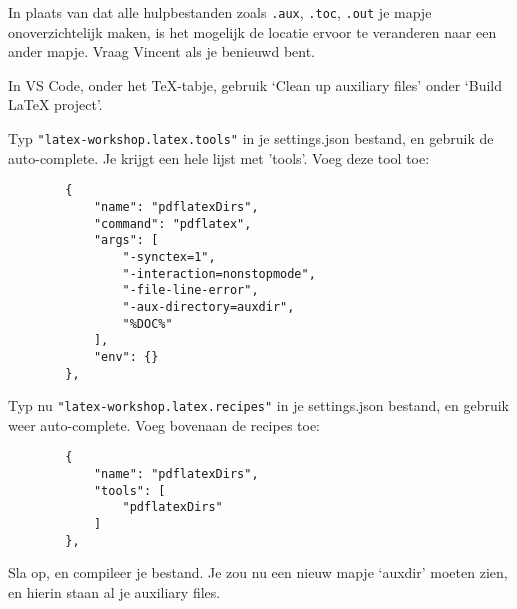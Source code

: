 \documentclass[a4paper]{article}
\begin{document}
\begin{exercise}\label{ex:auxDir}
    In plaats van dat alle hulpbestanden zoals \texttt{.aux}, \texttt{.toc}, \texttt{.out}
    je mapje onoverzichtelijk maken, is het mogelijk de locatie ervoor te veranderen naar een
    ander mapje. Vraag Vincent als je benieuwd bent.

    In VS Code, onder het TeX-tabje, gebruik `Clean up auxiliary files' onder `Build LaTeX project'.

    Typ \texttt{"latex-workshop.latex.tools"} in je settings.json bestand, en gebruik
    de auto-complete. Je krijgt een hele lijst met 'tools'. Voeg deze tool toe:
    \begin{verbatim}
        {
            "name": "pdflatexDirs",
            "command": "pdflatex",
            "args": [
                "-synctex=1",
                "-interaction=nonstopmode",
                "-file-line-error",
                "-aux-directory=auxdir",
                "%DOC%"
            ],
            "env": {}
        },
    \end{verbatim}
    Typ nu \texttt{"latex-workshop.latex.recipes"} in je settings.json bestand,
    en gebruik weer auto-complete. Voeg bovenaan de recipes toe:
    \begin{verbatim}
        {
            "name": "pdflatexDirs",
            "tools": [
                "pdflatexDirs"
            ]
        },
    \end{verbatim}
    Sla op, en compileer je bestand. Je zou nu een nieuw mapje `auxdir' moeten zien, en
    hierin staan al je auxiliary files.
\end{exercise}
\end{document}
